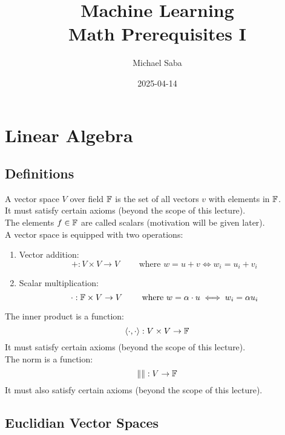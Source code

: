 \documentclass[12pt]{article}
\title{%
    \Huge Machine Learning \\
    \Large Math Prerequisites I
}
\date{2025-04-14}
\author{Michael Saba}
\begin{document}
\maketitle
\newpage
\setlength{\parindent}{0pt}

    \section*{Linear Algebra}

    \subsection*{Definitions}

    A vector space $V$
    over field $\mathbb{F}$ is the set of all vectors
    $v$ with elements in $\mathbb{F}$. \\
    It must satisfy certain axioms
    (beyond the scope of this  lecture). \\
    
    The elements $f \in \mathbb{F}$ are called scalars
    (motivation will be given later). \\
    
    A vector space is equipped with two operations:
    \begin{enumerate}
        \item 
        Vector addition:
        \[ +: V \times V \to V \qquad \text{ where }
        w = u + v \iff
        w_i = u_i + v_i \]
    \item 
        Scalar multiplication:
        \[ \cdot: \mathbb{F} \times V \to V \qquad \text{ where }
        w = \alpha \cdot u \iff
        w_i = \alpha u_i\]
    \end{enumerate}

    The inner product is a function:
    \[ \langle \cdot , \cdot \rangle : V \times V \to \mathbb{F} \]
    It must satisfy certain axioms
    (beyond the scope of this  lecture). \\

    The norm is a function:
    \[ \|\|  : V \to \mathbb{F} \]
    It must also satisfy certain axioms
    (beyond the scope of this  lecture). \\

    \newpage

    \subsection*{Euclidian Vector Spaces}
\end{document}
